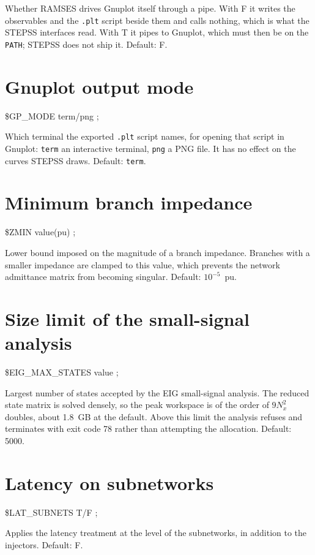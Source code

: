 Whether RAMSES drives Gnuplot itself through a pipe. With F it writes the
observables and the {\tt .plt} script beside them and calls nothing, which is
what the STEPSS interfaces read. With T it pipes to Gnuplot, which must then be
on the {\tt PATH}; STEPSS does not ship it. Default: F.


\section{Gnuplot output mode}

 \$GP\_MODE term/png ;

Which terminal the exported {\tt .plt} script names, for opening that script in
Gnuplot: {\tt term} an interactive terminal, {\tt png} a
PNG file. It has no effect on the curves STEPSS draws. Default: {\tt term}.


\section{Minimum branch impedance}

 \$ZMIN value(pu) ;

Lower bound imposed on the magnitude of a branch impedance. Branches with a
smaller impedance are clamped to this value, which prevents the network
admittance matrix from becoming singular. Default: $10^{-5}$~pu.


\section{Size limit of the small-signal
analysis}

 \$EIG\_MAX\_STATES value ;

Largest number of states accepted by the EIG small-signal analysis. The reduced
state matrix is solved densely, so the peak workspace is of the order of
$9N_x^2$ doubles, about 1.8~GB at the default. Above this limit the analysis
refuses and terminates with exit code 78 rather than attempting the allocation.
Default: 5000.


\section{Latency on subnetworks}

 \$LAT\_SUBNETS T/F ;

Applies the latency treatment at the level of the subnetworks, in addition to
the injectors. Default: F.


